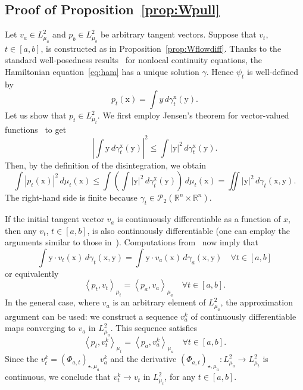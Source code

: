 \documentclass[sn-mathphys-num]{sn-jnl}
\numberwithin{equation}{section}
\theoremstyle{mythm}
\theoremstyle{mydef}
\renewcommand{\d}{\,d}
\begin{document}
\subsection{Proof of Proposition~\ref{prop:Wpull}}

Let \( v_a\in L^2_{\mu_a} \) and \( p_b\in L^2_{\mu_b} \) be arbitrary tangent vectors.
Suppose that \( v_t \), \( t\in [a,b] \), is constructed as in Proposition~\ref{prop:Wflowdiff}.
Thanks to the standard well-posedness results~\cite{bonnetDifferentialInclusionsWasserstein2021,bonnetNecessaryOptimalityConditions2021,averboukhPontryaginMaximumPrinciple2022,pogodaevNonlocalBalanceEquations2022,chertovskihOptimalControlNonlocal2023,MR4097258} for nonlocal continuity equations, the Hamiltonian equation~\eqref{eq:ham} has a unique solution \( \gamma \).
Hence \(\psi_t\) is well-defined by
\[
  p_t(\mathrm{x}) = \int y \d \gamma^\mathrm{x}_t(\mathrm{y}).
\]
Let us show that \( p_t \in L^2_{\mu_t} \).
We first employ Jensen's theorem for vector-valued functions~\cite{perlmanJensensInequalityConvex1974} to get
\[
  \left|\int \mathrm{y} \d \gamma^\mathrm{x}_t(\mathrm{y})\right|^2\le \int |\mathrm{y}|^2\d \gamma_t^\mathrm{x}(\mathrm{y}).
\]
Then, by the definition of the disintegration, we obtain
\[
  \int|p_t(\mathrm{x})|^2\d\mu_t(\mathrm{x})\le \int\left(\int |\mathrm{y}|^2\d \gamma_t^\mathrm{x}(\mathrm{y})\right) \d \mu_t(\mathrm{x}) = \iint |\mathrm{y}|^2\d \gamma_t(\mathrm{x},\mathrm{y}).
\]
The right-hand side is finite because \( \gamma_t\in \mathcal{P}_2(\mathbb{R}^n \times \mathbb{R}^n) \).

If the initial tangent vector \( v_a \) is continuously differentiable as a function of \( x \), then any \( v_t \), \( t\in [a,b] \), is also continuously differentiable (one can employ the arguments similar to those in~\cite[Remark 3.1]{chertovskihOptimalControlNonlocal2023}).
Computations from~\cite[Section 3.4]{chertovskihOptimalControlNonlocal2023} now imply that
\[
  \int \mathrm{y} \cdot v_t(\mathrm{x})\d\gamma_t(\mathrm{x},\mathrm{y}) = \int \mathrm{y} \cdot v_a(\mathrm{x})\d \gamma_a(\mathrm{x},\mathrm{y}) \quad \forall t\in [a,b]
\]
or equivalently
\[
\left<p_t, v_t \right>_{\mu_t} = \left< p_a,v_a \right>_{\mu_a} \quad \forall t\in [a,b].
\]
In the general case, where \( v_a \) is an arbitrary element of \( L^2_{\mu_a} \), the approximation argument can be used: we construct a sequence \( v_a^k\) of continuously differentiable maps converging to \( v_a \) in \( L^2_{\mu_a} \).
This sequence satisfies
\[
\left<p_t, v^k_t \right>_{\mu_t} = \left< p_a,v^k_a \right>_{\mu_a} \quad \forall t\in [a,b].
\]
Since the \( v_{t}^k=(\Phi_{a,t})_{\star,\mu_{a}}v_{a}^k \) and the derivative \( (\Phi_{a,t})_{\star,\mu_{a}} \colon L^2_{\mu_a}\to L^2_{\mu_t} \) is continuous, we conclude that \( v^k_t\to v_{t} \) in \( L^2_{\mu_t} \), for any \( t\in [a,b] \).
\end{document}
